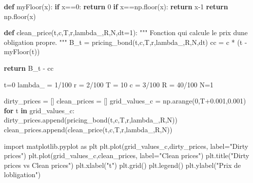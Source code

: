 \documentclass[
  letterpaper,
  DIV=11,
  numbers=noendperiod]{scrartcl}
\newenvironment{Shaded}{\begin{snugshade}}{\end{snugshade}}
\newcommand{\CommentTok}[1]{\textcolor[rgb]{0.37,0.37,0.37}{#1}}
\newcommand{\ControlFlowTok}[1]{\textcolor[rgb]{0.00,0.23,0.31}{\textbf{#1}}}
\newcommand{\DecValTok}[1]{\textcolor[rgb]{0.68,0.00,0.00}{#1}}
\newcommand{\FloatTok}[1]{\textcolor[rgb]{0.68,0.00,0.00}{#1}}
\newcommand{\ImportTok}[1]{\textcolor[rgb]{0.00,0.46,0.62}{#1}}
\newcommand{\KeywordTok}[1]{\textcolor[rgb]{0.00,0.23,0.31}{\textbf{#1}}}
\newcommand{\NormalTok}[1]{\textcolor[rgb]{0.00,0.23,0.31}{#1}}
\newcommand{\OperatorTok}[1]{\textcolor[rgb]{0.37,0.37,0.37}{#1}}
\newcommand{\StringTok}[1]{\textcolor[rgb]{0.13,0.47,0.30}{#1}}
\begin{document}
\begin{Shaded}
\begin{Highlighting}[]
\KeywordTok{def}\NormalTok{ myFloor(x):}
    \ControlFlowTok{if}\NormalTok{ x}\OperatorTok{==}\DecValTok{0}\NormalTok{:}
        \ControlFlowTok{return} \DecValTok{0}
    \ControlFlowTok{if}\NormalTok{ x}\OperatorTok{==}\NormalTok{np.floor(x):}
        \ControlFlowTok{return}\NormalTok{ x}\OperatorTok{{-}}\DecValTok{1}
    \ControlFlowTok{return}\NormalTok{ np.floor(x)}

\KeywordTok{def}\NormalTok{ clean\_price(t,c,T,r,lambda\_,R,N,dt}\OperatorTok{=}\DecValTok{1}\NormalTok{):}
    \CommentTok{"""}
\CommentTok{    Fonction qui calcule le prix d\textquotesingle{}une obligation propre.}
\CommentTok{    """}
\NormalTok{    B\_t }\OperatorTok{=}\NormalTok{ pricing\_bond(t,c,T,r,lambda\_,R,N,dt)}
\NormalTok{    cc }\OperatorTok{=}\NormalTok{ c }\OperatorTok{*}\NormalTok{ (t }\OperatorTok{{-}}\NormalTok{ myFloor(t))}

    \ControlFlowTok{return}\NormalTok{ B\_t }\OperatorTok{{-}}\NormalTok{ cc}
\end{Highlighting}
\end{Shaded}

\begin{Shaded}
\begin{Highlighting}[]
\NormalTok{t}\OperatorTok{=}\DecValTok{0}
\NormalTok{lambda\_ }\OperatorTok{=} \DecValTok{1}\OperatorTok{/}\DecValTok{100}
\NormalTok{r }\OperatorTok{=} \DecValTok{2}\OperatorTok{/}\DecValTok{100}
\NormalTok{T }\OperatorTok{=} \DecValTok{10}
\NormalTok{c }\OperatorTok{=} \DecValTok{3}\OperatorTok{/}\DecValTok{100}
\NormalTok{R }\OperatorTok{=} \DecValTok{40}\OperatorTok{/}\DecValTok{100}
\NormalTok{N}\OperatorTok{=}\DecValTok{1}


\NormalTok{dirty\_prices }\OperatorTok{=}\NormalTok{ []}
\NormalTok{clean\_prices }\OperatorTok{=}\NormalTok{ []}
\NormalTok{grid\_values\_c }\OperatorTok{=}\NormalTok{ np.arange(}\DecValTok{0}\NormalTok{,T}\OperatorTok{+}\FloatTok{0.001}\NormalTok{,}\FloatTok{0.001}\NormalTok{)}
\ControlFlowTok{for}\NormalTok{ t }\KeywordTok{in}\NormalTok{ grid\_values\_c:}
\NormalTok{    dirty\_prices.append(pricing\_bond(t,c,T,r,lambda\_,R,N))}
\NormalTok{    clean\_prices.append(clean\_price(t,c,T,r,lambda\_,R,N))}


\ImportTok{import}\NormalTok{ matplotlib.pyplot }\ImportTok{as}\NormalTok{ plt}
\NormalTok{plt.plot(grid\_values\_c,dirty\_prices, label}\OperatorTok{=}\StringTok{"Dirty prices"}\NormalTok{)}
\NormalTok{plt.plot(grid\_values\_c,clean\_prices, label}\OperatorTok{=}\StringTok{"Clean prices"}\NormalTok{)}
\NormalTok{plt.title(}\StringTok{"Dirty prices vs Clean prices"}\NormalTok{)}
\NormalTok{plt.xlabel(}\StringTok{"t"}\NormalTok{)}
\NormalTok{plt.grid()}
\NormalTok{plt.legend()}
\NormalTok{plt.ylabel(}\StringTok{"Prix de l\textquotesingle{}obligation"}\NormalTok{)}
\end{Highlighting}
\end{Shaded}
\end{document}
